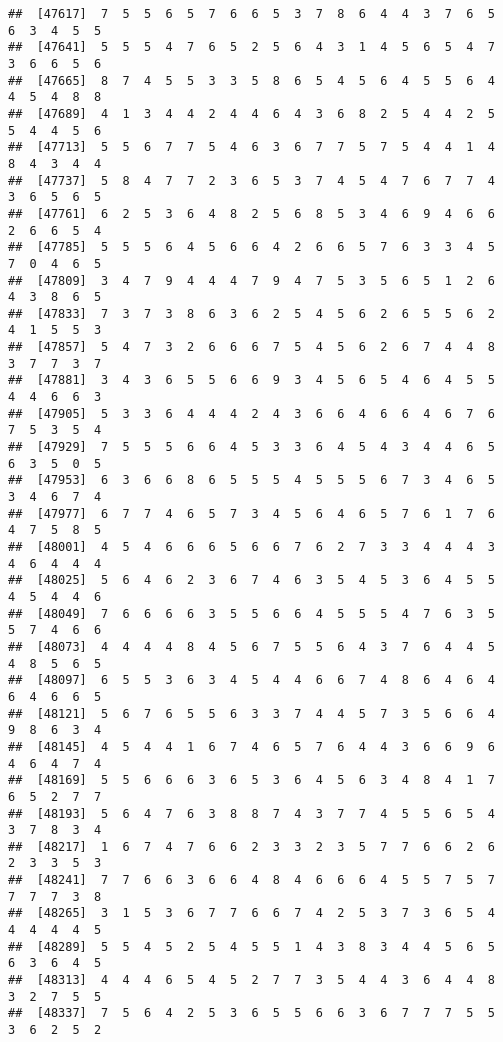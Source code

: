 \documentclass[
]{book}
\begin{document}
\begin{verbatim}
##  [47617]  7  5  5  6  5  7  6  6  5  3  7  8  6  4  4  3  7  6  5  6  3  4  5  5
##  [47641]  5  5  5  4  7  6  5  2  5  6  4  3  1  4  5  6  5  4  7  3  6  6  5  6
##  [47665]  8  7  4  5  5  3  3  5  8  6  5  4  5  6  4  5  5  6  4  4  5  4  8  8
##  [47689]  4  1  3  4  4  2  4  4  6  4  3  6  8  2  5  4  4  2  5  5  4  4  5  6
##  [47713]  5  5  6  7  7  5  4  6  3  6  7  7  5  7  5  4  4  1  4  8  4  3  4  4
##  [47737]  5  8  4  7  7  2  3  6  5  3  7  4  5  4  7  6  7  7  4  3  6  5  6  5
##  [47761]  6  2  5  3  6  4  8  2  5  6  8  5  3  4  6  9  4  6  6  2  6  6  5  4
##  [47785]  5  5  5  6  4  5  6  6  4  2  6  6  5  7  6  3  3  4  5  7  0  4  6  5
##  [47809]  3  4  7  9  4  4  4  7  9  4  7  5  3  5  6  5  1  2  6  4  3  8  6  5
##  [47833]  7  3  7  3  8  6  3  6  2  5  4  5  6  2  6  5  5  6  2  4  1  5  5  3
##  [47857]  5  4  7  3  2  6  6  6  7  5  4  5  6  2  6  7  4  4  8  3  7  7  3  7
##  [47881]  3  4  3  6  5  5  6  6  9  3  4  5  6  5  4  6  4  5  5  4  4  6  6  3
##  [47905]  5  3  3  6  4  4  4  2  4  3  6  6  4  6  6  4  6  7  6  7  5  3  5  4
##  [47929]  7  5  5  5  6  6  4  5  3  3  6  4  5  4  3  4  4  6  5  6  3  5  0  5
##  [47953]  6  3  6  6  8  6  5  5  5  4  5  5  5  6  7  3  4  6  5  3  4  6  7  4
##  [47977]  6  7  7  4  6  5  7  3  4  5  6  4  6  5  7  6  1  7  6  4  7  5  8  5
##  [48001]  4  5  4  6  6  6  5  6  6  7  6  2  7  3  3  4  4  4  3  4  6  4  4  4
##  [48025]  5  6  4  6  2  3  6  7  4  6  3  5  4  5  3  6  4  5  5  4  5  4  4  6
##  [48049]  7  6  6  6  6  3  5  5  6  6  4  5  5  5  4  7  6  3  5  5  7  4  6  6
##  [48073]  4  4  4  4  8  4  5  6  7  5  5  6  4  3  7  6  4  4  5  4  8  5  6  5
##  [48097]  6  5  5  3  6  3  4  5  4  4  6  6  7  4  8  6  4  6  4  6  4  6  6  5
##  [48121]  5  6  7  6  5  5  6  3  3  7  4  4  5  7  3  5  6  6  4  9  8  6  3  4
##  [48145]  4  5  4  4  1  6  7  4  6  5  7  6  4  4  3  6  6  9  6  4  6  4  7  4
##  [48169]  5  5  6  6  6  3  6  5  3  6  4  5  6  3  4  8  4  1  7  6  5  2  7  7
##  [48193]  5  6  4  7  6  3  8  8  7  4  3  7  7  4  5  5  6  5  4  3  7  8  3  4
##  [48217]  1  6  7  4  7  6  6  2  3  3  2  3  5  7  7  6  6  2  6  2  3  3  5  3
##  [48241]  7  7  6  6  3  6  6  4  8  4  6  6  6  4  5  5  7  5  7  7  7  7  3  8
##  [48265]  3  1  5  3  6  7  7  6  6  7  4  2  5  3  7  3  6  5  4  4  4  4  4  5
##  [48289]  5  5  4  5  2  5  4  5  5  1  4  3  8  3  4  4  5  6  5  6  3  6  4  5
##  [48313]  4  4  4  6  5  4  5  2  7  7  3  5  4  4  3  6  4  4  8  3  2  7  5  5
##  [48337]  7  5  6  4  2  5  3  6  5  5  6  6  3  6  7  7  7  5  5  3  6  2  5  2

\end{verbatim}
\end{document}
